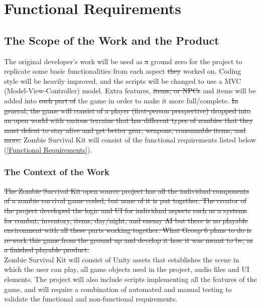\documentclass[12pt, titlepage]{article}
\begin{document}
\section{Functional Requirements} 

\subsection{The Scope of the Work and the Product}
The original developer’s work will be used as \sout{a} ground zero for the project to replicate some basic functionalities from each aspect \sout{they} worked on. Coding style will be heavily improved, and the scripts will be changed to use a MVC (Model-View-Controller) model. Extra features, \sout{items, or NPCs} {\color{magenta} and items} will be added into \sout{each part of} the game in order to make it more full/complete. \sout{In general, the game will consist of a player (first-person perspective) dropped into an open world with various terrains that has different types of zombies that they must defeat to stay alive and get better gear, weapons, consumable items, and more.}
 {\color{magenta} Zombie Survival Kit will consist of the functional requirements listed below (\ref{Functional Requirements}).}

\subsubsection{The Context of the Work}
\sout{The Zombie Survival Kit open source project has all the individual components of a zombie survival game coded, but none of it is put together. The creator of the project developed the logic and UI for individual aspects such as a systems for combat, inventory, items, day/night, and enemy AI but there is no playable environment with all these parts working together. What Group 6 plans to do is re-work this game from the ground up and develop it how it was meant to be, as a finished playable product.}\\
{\color{magenta} Zombie Survival Kit will consist of Unity assets that establishes the scene in which the user can play, all game objects used in the project, audio files and UI elements. The project will also include scripts implementing all the features of the game, and will require a combination of automated and manual testing to validate the functional and non-functional requirements.} 
\end{document}

